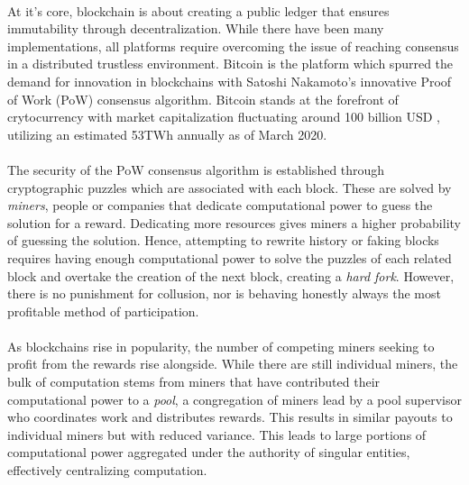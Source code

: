 \paragraph{} At it's core, blockchain is about creating a public ledger that ensures immutability through decentralization. While there have been many implementations, all platforms require overcoming the issue of reaching consensus in a distributed trustless environment. Bitcoin \cite{nakamoto2009} is the platform which spurred the demand for innovation in blockchains with Satoshi Nakamoto's innovative Proof of Work (PoW) consensus algorithm. Bitcoin stands at the forefront of crytocurrency with market capitalization fluctuating around 100 billion USD \cite{bitcoinmarketcap2020}, utilizing an estimated 53TWh annually \cite{cambridge2020} as of March 2020.


\paragraph{} The security of the PoW consensus algorithm is established through cryptographic puzzles which are associated with each block. These are solved by \textit{miners}, people or companies that dedicate computational power to guess the solution for a reward. Dedicating more resources gives miners a higher probability of guessing the solution. Hence, attempting to rewrite history or faking blocks requires having enough computational power to solve the puzzles of each related block and overtake the creation of the next block, creating a \textit{hard fork}. However, there is no punishment for collusion, nor is behaving honestly always the most profitable method of participation. 

\paragraph{} As blockchains rise in popularity, the number of competing miners seeking to profit from the rewards rise alongside. While there are still individual miners, the bulk of computation stems from miners that have contributed their computational power to a \textit{pool}, a congregation of miners lead by a pool supervisor who coordinates work and distributes rewards. This results in similar payouts to individual miners but with reduced variance. This leads to large portions of computational power aggregated under the authority of singular entities, effectively centralizing computation.

